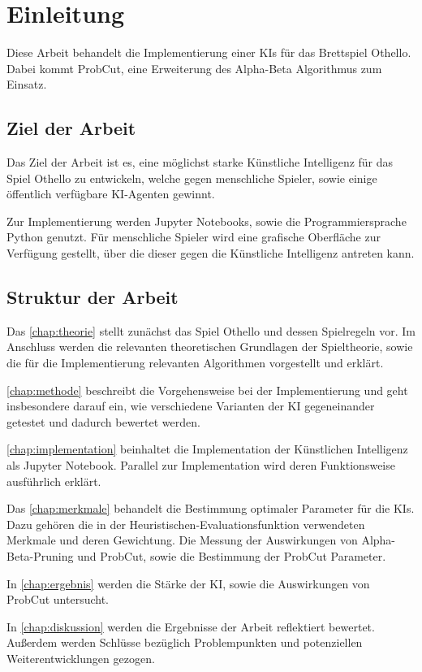 
\chapter{Einleitung}
\label{chap:einleitung}

Diese Arbeit behandelt die Implementierung einer \acp{KI} für das Brettspiel Othello. Dabei kommt
ProbCut\cite[S.~1]{probcut}, eine Erweiterung des Alpha-Beta Algorithmus zum Einsatz.

\section{Ziel der Arbeit}
Das Ziel der Arbeit ist es, eine möglichst starke Künstliche Intelligenz für das Spiel Othello zu entwickeln, welche
gegen menschliche Spieler, sowie einige öffentlich verfügbare KI-Agenten gewinnt.

Zur Implementierung werden Jupyter Notebooks, sowie die Programmiersprache Python genutzt.
Für menschliche Spieler wird eine grafische Oberfläche zur Verfügung gestellt, über
die dieser gegen die Künstliche Intelligenz antreten kann.

\section{Struktur der Arbeit}
Das \autoref{chap:theorie} stellt zunächst das Spiel Othello und dessen Spielregeln vor. Im Anschluss werden die
relevanten theoretischen Grundlagen der Spieltheorie, sowie die für die Implementierung relevanten Algorithmen
vorgestellt und erklärt.

\autoref{chap:methode} beschreibt die Vorgehensweise bei der Implementierung und geht insbesondere darauf ein, wie
verschiedene Varianten der KI gegeneinander getestet und dadurch bewertet werden.

\autoref{chap:implementation} beinhaltet die Implementation der Künstlichen Intelligenz als Jupyter Notebook. Parallel
zur Implementation wird deren Funktionsweise ausführlich erklärt.

Das \autoref{chap:merkmale} behandelt die Bestimmung optimaler Parameter für die \acp{KI}. Dazu gehören die in der
Heuristischen-Evaluationsfunktion verwendeten Merkmale und deren Gewichtung. Die Messung der Auswirkungen von
Alpha-Beta-Pruning und ProbCut, sowie die Bestimmung der ProbCut Parameter.

In \autoref{chap:ergebnis} werden die Stärke der KI, sowie die Auswirkungen von ProbCut untersucht.

In \autoref{chap:diskussion} werden die Ergebnisse der Arbeit reflektiert bewertet. Außerdem werden Schlüsse bezüglich
Problempunkten und potenziellen Weiterentwicklungen gezogen.